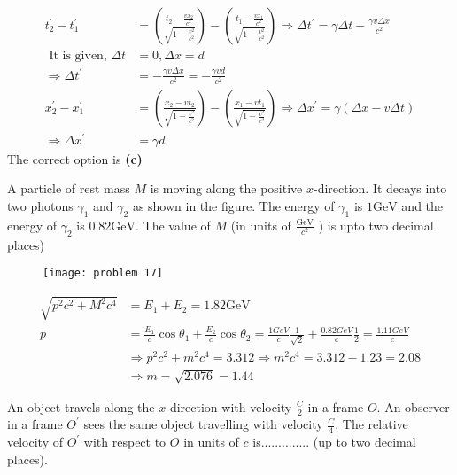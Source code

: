 \begin{enumerate}
\begin{answer}
	\begin{align*}
	t_{2}^{\prime}-t_{1}^{\prime}&=\left(\frac{t_{2}-\frac{v x_{2}}{c^{2}}}{\sqrt{1-\frac{v^{2}}{c^{2}}}}\right)-\left(\frac{t_{1}-\frac{v x_{1}}{c^{2}}}{\sqrt{1-\frac{v^{2}}{c^{2}}}}\right) \Rightarrow \Delta t^{\prime}=\gamma \Delta t-\frac{\gamma v \Delta x}{c^{2}}\\
	\text { It is given, } \Delta t&=0, \Delta x=d\\
	\Rightarrow \Delta t^{\prime}&=-\frac{\gamma v \Delta x}{c^{2}}=-\frac{\gamma v d}{c^{2}}\\
	x_{2}^{\prime}-x_{1}^{\prime}&=\left(\frac{x_{2}-v t_{2}}{\sqrt{1-\frac{v^{2}}{c^{2}}}}\right)-\left(\frac{x_{1}-v t_{1}}{\sqrt{1-\frac{v^{2}}{c^{2}}}}\right) \Rightarrow \Delta x^{\prime}=\gamma(\Delta x-v \Delta t)\\
	\Rightarrow \Delta x^{\prime}&=\gamma d
	\end{align*}
	The correct option is \textbf{(c)}
\end{answer}
\begin{minipage}{\textwidth}
	\item A particle of rest mass $M$ is moving along the positive $x$-direction. It decays into two photons $\gamma_{1}$ and $\gamma_{2}$ as shown in the figure. The energy of $\gamma_{1}$ is $1 \mathrm{GeV}$ and the energy of $\gamma_{2}$ is $0.82 \mathrm{GeV}$. The value of $M$ (in units of $\frac{\mathrm{GeV}}{c^{2}}$ ) is upto two decimal places)
	\begin{figure}[H]
		\centering
		\texttt{[image: problem 17]}
	\end{figure}
\end{minipage}
\begin{answer}
\begin{align*}
\sqrt{p^{2} c^{2}+M^{2} c^{4}}&=E_{1}+E_{2}=1.82 \mathrm{GeV}\\
p&=\frac{E_{1}}{c} \cos \theta_{1}+\frac{E_{2}}{c} \cos \theta_{2}=\frac{1 G e V}{c} \frac{1}{\sqrt{2}}+\frac{0.82 G e V}{c} \frac{1}{2}=\frac{1.11 G e V}{c}\\
&\Rightarrow p^{2} c^{2}+m^{2} c^{4}=3.312 \Rightarrow m^{2} c^{4}=3.312-1.23=2.08\\
&\Rightarrow m=\sqrt{2.076}=1.44
\end{align*}
\end{answer}
\begin{minipage}{\textwidth}
	\item An object travels along the $x$-direction with velocity $\frac{C}{2}$ in a frame $O$. An observer in a frame $O^{\prime}$ sees the same object travelling with velocity $\frac{C}{4}$. The relative velocity of $O^{\prime}$ with respect to $O$ in units of $c$ is.............. (up to two decimal places).

\end{minipage}
\end{enumerate}
